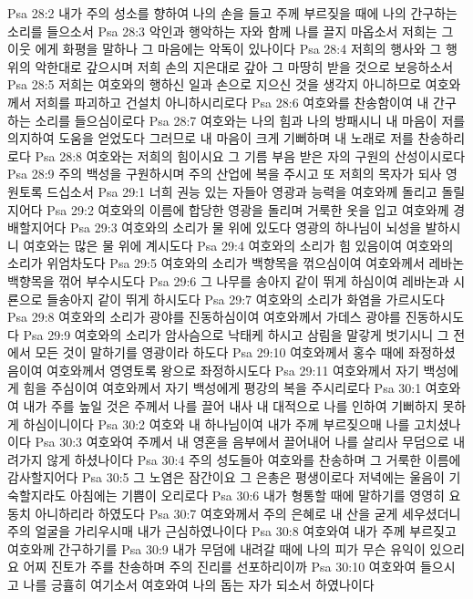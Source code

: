 Psa 28:2  내가 주의 성소를 향하여 나의 손을 들고 주께 부르짖을 때에 나의 간구하는 소리를 들으소서
Psa 28:3  악인과 행악하는 자와 함께 나를 끌지 마옵소서 저희는 그 이웃 에게 화평을 말하나 그 마음에는 악독이 있나이다
Psa 28:4  저희의 행사와 그 행위의 악한대로 갚으시며 저희 손의 지은대로 갚아 그 마땅히 받을 것으로 보응하소서
Psa 28:5  저희는 여호와의 행하신 일과 손으로 지으신 것을 생각지 아니하므로 여호와께서 저희를 파괴하고 건설치 아니하시리로다
Psa 28:6  여호와를 찬송함이여 내 간구하는 소리를 들으심이로다
Psa 28:7  여호와는 나의 힘과 나의 방패시니 내 마음이 저를 의지하여 도움을 얻었도다 그러므로 내 마음이 크게 기뻐하며 내 노래로 저를 찬송하리로다
Psa 28:8  여호와는 저희의 힘이시요 그 기름 부음 받은 자의 구원의 산성이시로다
Psa 28:9  주의 백성을 구원하시며 주의 산업에 복을 주시고 또 저희의 목자가 되사 영원토록 드십소서
Psa 29:1  너희 권능 있는 자들아 영광과 능력을 여호와께 돌리고 돌릴지어다
Psa 29:2  여호와의 이름에 합당한 영광을 돌리며 거룩한 옷을 입고 여호와께 경배할지어다
Psa 29:3  여호와의 소리가 물 위에 있도다 영광의 하나님이 뇌성을 발하시니 여호와는 많은 물 위에 계시도다
Psa 29:4  여호와의 소리가 힘 있음이여 여호와의 소리가 위엄차도다
Psa 29:5  여호와의 소리가 백향목을 꺾으심이여 여호와께서 레바논 백향목을 꺾어 부수시도다
Psa 29:6  그 나무를 송아지 같이 뛰게 하심이여 레바논과 시룐으로 들송아지 같이 뛰게 하시도다
Psa 29:7  여호와의 소리가 화염을 가르시도다
Psa 29:8  여호와의 소리가 광야를 진동하심이여 여호와께서 가데스 광야를 진동하시도다
Psa 29:9  여호와의 소리가 암사슴으로 낙태케 하시고 삼림을 말갛게 벗기시니 그 전에서 모든 것이 말하기를 영광이라 하도다
Psa 29:10  여호와께서 홍수 때에 좌정하셨음이여 여호와께서 영영토록 왕으로 좌정하시도다
Psa 29:11  여호와께서 자기 백성에게 힘을 주심이여 여호와께서 자기 백성에게 평강의 복을 주시리로다
Psa 30:1  여호와여 내가 주를 높일 것은 주께서 나를 끌어 내사 내 대적으로 나를 인하여 기뻐하지 못하게 하심이니이다
Psa 30:2  여호와 내 하나님이여 내가 주께 부르짖으매 나를 고치셨나이다
Psa 30:3  여호와여 주께서 내 영혼을 음부에서 끌어내어 나를 살리사 무덤으로 내려가지 않게 하셨나이다
Psa 30:4  주의 성도들아 여호와를 찬송하며 그 거룩한 이름에 감사할지어다
Psa 30:5  그 노염은 잠간이요 그 은총은 평생이로다 저녁에는 울음이 기숙할지라도 아침에는 기쁨이 오리로다
Psa 30:6  내가 형통할 때에 말하기를 영영히 요동치 아니하리라 하였도다
Psa 30:7  여호와께서 주의 은혜로 내 산을 굳게 세우셨더니 주의 얼굴을 가리우시매 내가 근심하였나이다
Psa 30:8  여호와여 내가 주께 부르짖고 여호와께 간구하기를
Psa 30:9  내가 무덤에 내려갈 때에 나의 피가 무슨 유익이 있으리요 어찌 진토가 주를 찬송하며 주의 진리를 선포하리이까
Psa 30:10  여호와여 들으시고 나를 긍휼히 여기소서 여호와여 나의 돕는 자가 되소서 하였나이다
